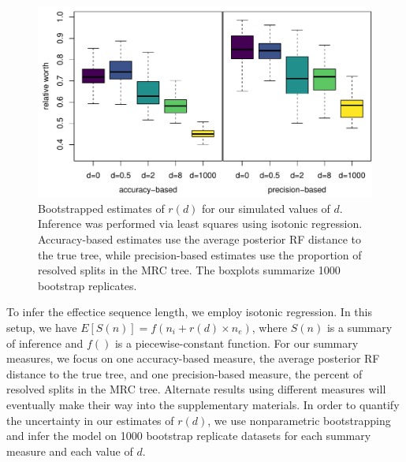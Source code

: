 \documentclass[11pt]{article}
\begin{document}
\begin{figure}
  \centering
  \includegraphics[width=\textwidth]{figures/relative_worth.pdf}
  \caption{
    Bootstrapped estimates of $r(d)$ for our simulated values of $d$.
    Inference was performed via least squares using isotonic regression.
    Accuracy-based estimates use the average posterior RF distance to the true tree, while precision-based estimates use the proportion of resolved splits in the MRC tree.
    The boxplots summarize 1000 bootstrap replicates.
  }
  \label{fig:worth}
\end{figure}

To infer the effectice sequence length, we employ isotonic regression.
In this setup, we have $E[S(n)] = f(n_i + r(d) \times n_e)$, where $S(n)$ is a summary of inference and $f()$ is a piecewise-constant function.
For our summary measures, we focus on one accuracy-based measure, the average posterior RF distance to the true tree, and one precision-based measure, the percent of resolved splits in the MRC tree.
Alternate results using different measures will eventually make their way into the supplementary materials.
In order to quantify the uncertainty in our estimates of $r(d)$, we use nonparametric bootstrapping \citep{efron1992bootstrap} and infer the model on 1000 bootstrap replicate datasets for each summary measure and each value of $d$.
\end{document}
